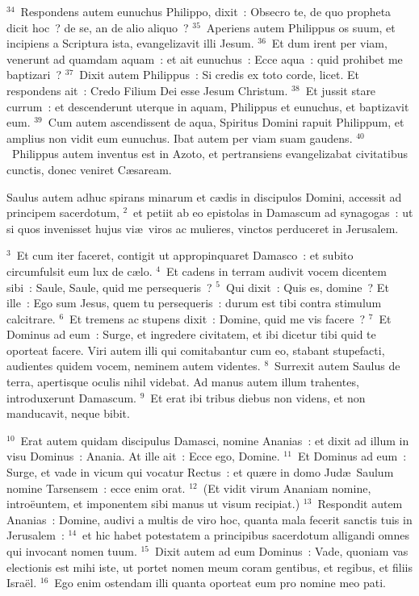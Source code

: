 ${}^{34}$~Respondens autem eunuchus Philippo, dixit~: Obsecro te, de quo propheta dicit hoc~? de se, an de alio aliquo~?
${}^{35}$~Aperiens autem Philippus os suum, et incipiens a Scriptura ista, evangelizavit illi Jesum.
${}^{36}$~Et dum irent per viam, venerunt ad quamdam aquam~: et ait eunuchus~: Ecce aqua~: quid prohibet me baptizari~?
${}^{37}$~Dixit autem Philippus~: Si credis ex toto corde, licet. Et respondens ait~: Credo Filium Dei esse Jesum Christum.
${}^{38}$~Et jussit stare currum~: et descenderunt uterque in aquam, Philippus et eunuchus, et baptizavit eum.
${}^{39}$~Cum autem ascendissent de aqua, Spiritus Domini rapuit Philippum, et amplius non vidit eum eunuchus. Ibat autem per viam suam gaudens.
${}^{40}$~Philippus autem inventus est in Azoto, et pertransiens evangelizabat civitatibus cunctis, donec veniret C\ae saream.

\lettrine[lines=3,image=true,loversize=0.05,lraise=-0.03]{S}{}aulus autem adhuc spirans minarum et c\ae dis in discipulos Domini, accessit ad principem sacerdotum,
${}^{2}$~et petiit ab eo epistolas in Damascum ad synagogas~: ut si quos invenisset hujus vi\ae\ viros ac mulieres, vinctos perduceret in Jerusalem.


${}^{3}$~Et cum iter faceret, contigit ut appropinquaret Damasco~: et subito circumfulsit eum lux de c\ae lo.
${}^{4}$~Et cadens in terram audivit vocem dicentem sibi~: Saule, Saule, quid me persequeris~?
${}^{5}$~Qui dixit~: Quis es, domine~? Et ille~: Ego sum Jesus, quem tu persequeris~: durum est tibi contra stimulum calcitrare.
${}^{6}$~Et tremens ac stupens dixit~: Domine, quid me vis facere~?
${}^{7}$~Et Dominus ad eum~: Surge, et ingredere civitatem, et ibi dicetur tibi quid te oporteat facere. Viri autem illi qui comitabantur cum eo, stabant stupefacti, audientes quidem vocem, neminem autem videntes.
${}^{8}$~Surrexit autem Saulus de terra, apertisque oculis nihil videbat. Ad manus autem illum trahentes, introduxerunt Damascum.
${}^{9}$~Et erat ibi tribus diebus non videns, et non manducavit, neque bibit.


${}^{10}$~Erat autem quidam discipulus Damasci, nomine Ananias~: et dixit ad illum in visu Dominus~: Anania. At ille ait~: Ecce ego, Domine.
${}^{11}$~Et Dominus ad eum~: Surge, et vade in vicum qui vocatur Rectus~: et qu\ae re in domo Jud\ae\ Saulum nomine Tarsensem~: ecce enim orat.
${}^{12}$~(Et vidit virum Ananiam nomine, intro\"euntem, et imponentem sibi manus ut visum recipiat.)
${}^{13}$~Respondit autem Ananias~: Domine, audivi a multis de viro hoc, quanta mala fecerit sanctis tuis in Jerusalem~:
${}^{14}$~et hic habet potestatem a principibus sacerdotum alligandi omnes qui invocant nomen tuum.
${}^{15}$~Dixit autem ad eum Dominus~: Vade, quoniam vas electionis est mihi iste, ut portet nomen meum coram gentibus, et regibus, et filiis Isra\"el.
${}^{16}$~Ego enim ostendam illi quanta oporteat eum pro nomine meo pati.


